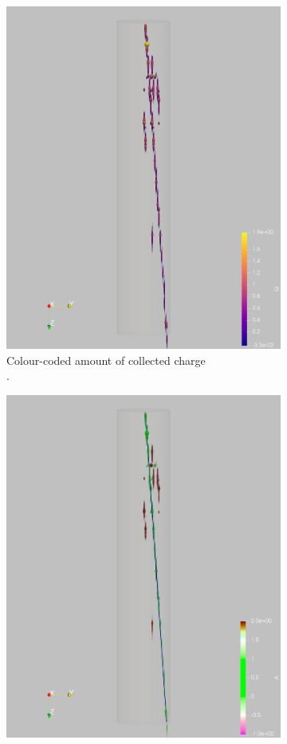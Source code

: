 \documentclass[instruments,article,submit,moreauthors,pdftex]{Definitions/mdpi}
\begin{document}
\begin{figure}[htb]
	\centering
	\begin{subfigure}{\textwidth}
		\centering
		\includegraphics[viewport=600 0 1000 2000, clip, height=\textwidth, angle=90]{event967_pulses_q}
		\caption{Colour-coded amount of collected charge\\.}
		\label{fig:pca_a}
	\end{subfigure}
	\begin{subfigure}{\textwidth}
		\centering
		\includegraphics[viewport=600 0 1000 2000, clip, height=\textwidth, angle=90]{event967_pulses_a_pca}

\end{subfigure}
\end{figure}
\end{document}
